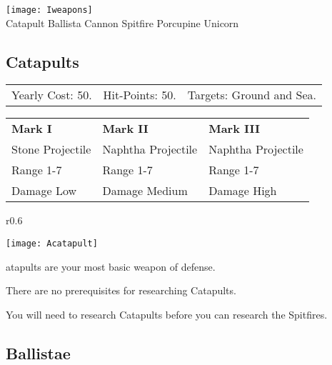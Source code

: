 
\begin{center}
    \texttt{[image: Iweapons]} %
    \\ Catapult Ballista Cannon Spitfire Porcupine Unicorn
\end{center}

\clearpage  %

\subsection{\textsf{Catapults}}


\begin{tabular}{p{1.264in} p{1.264in} p{1.264in}}
Yearly Cost: 50. & Hit-Points: 50. & Targets: Ground and Sea.
\end{tabular}

\begin{tabular}{|p{1.264in} p{1.264in} p{1.264in}|}
    \hline
    \textbf{Mark I}    & \textbf{Mark II} & \textbf{Mark III} \\
    Stone Projectile & Naphtha Projectile & Naphtha Projectile \\
    Range 1-7 & Range 1-7& Range 1-7 \\
    Damage Low & Damage Medium & Damage High \\
    \hline
\end{tabular}

\begin{wrapfigure}{r}{0.6\textwidth}
    \vspace{-20pt}
    \begin{center}
        \texttt{[image: Acatapult]} %
    \end{center}
    \vspace{-20pt}
\end{wrapfigure}

atapults are your most basic weapon of defense. 

There are no prerequisites for researching Catapults. 

You will need to research Catapults before you can research the Spitfires.

\clearpage  %

\subsection{\textsf{Ballistae}}

